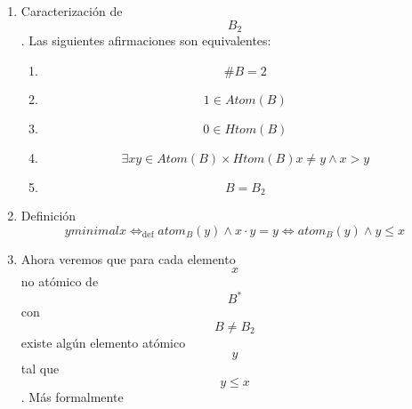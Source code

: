 \documentclass[
]{article}
\providecommand{\tightlist}{%
  \setlength{\itemsep}{0pt}\setlength{\parskip}{0pt}}
\begin{document}
\begin{enumerate}
\begin{enumerate}
\begin{enumerate}
\begin{enumerate}
        \begin{enumerate}
        \def\labelenumv{\arabic{enumv}.}
        \tightlist
        \item
          \[\varphi{{{(\overline{x})} = \begin{Bmatrix}
          {1\Leftarrow{x = i}} \\
          {0\Leftarrow{x = s}}
          \end{Bmatrix}} =}\]
        \item
          \[{= \begin{Bmatrix}
          {\overline{0}\Leftarrow{x = i}} \\
          {\overline{1}\Leftarrow{x = s}}
          \end{Bmatrix}} =\]
        \item
          \[{= \begin{Bmatrix}
          {\overline{\varphi{(i)}}\Leftarrow{x = i}} \\
          {\overline{\varphi{(s)}}\Leftarrow{x = s}}
          \end{Bmatrix}} = \overline{\varphi{(x)}}\]
        \end{enumerate}
      \end{enumerate}
    \item
      Caracterización de \[B_{2}\]. Las siguientes afirmaciones son
      equivalentes:

      \begin{enumerate}
      \def\labelenumiv{\arabic{enumiv}.}
      \tightlist
      \item
        \[\#{B = 2}\]
      \item
        \[{1 \in \mathit{Atom}}{(B)}\]
      \item
        \[{0 \in \mathit{Htom}}{(B)}\]
      \item
        \[\exists{\mathit{xy} \in {\mathit{Atom}{{(B)} \times \mathit{Htom}}{(B)}}}{{x \neq {y \land x}} > y}\]
      \item
        \[B = B_{2}\]
      \end{enumerate}
    \item
      Definición
      \[y\mathsf{\mathit{minimal}}x\Leftrightarrow_{\text{def}}\mathsf{\mathit{atom}}_{B}{{{{(y)} \land x} \cdot y} = y}\Leftrightarrow\mathsf{\mathit{atom}}_{B}{{{(y)} \land y} \leq x}\]
    \item
      Ahora veremos que para cada elemento \[x\] no atómico de
      \[B^{\ast}\] con \[B \neq B_{2}\] existe algún elemento atómico
      \[y\] tal que \[y \leq x\]. Más formalmente


\end{enumerate}
\end{enumerate}
\end{enumerate}
\end{document}
